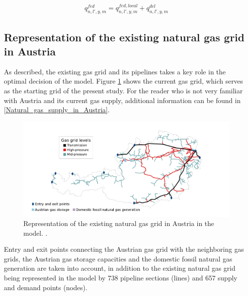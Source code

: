 \begin{align}\label{gas_balance_source}
	q^{fed}_{n,l',y,m} = q^{fed,local}_{n,l',y,m} + q^{del}_{n,l',y,m}
\end{align}

\subsection{Representation of the existing natural gas grid in Austria}\label{gas_grid_austria}
As described, the existing gas grid and its pipelines takes a key role in the optimal decision of the model. Figure \ref{method:existing_gas_grid} shows the current gas grid, which serves as the starting grid of the present study. For the reader who is not very familiar with Austria and its current gas supply, additional information can be found in \ref{Natural_gas_supply_in_Austria}. 

\begin{figure}[h]
	\centering
	\includegraphics[width=1\linewidth]{figures/method/existing_gas_grid/2023_existing_natural_gas_grid.pdf}
	\caption{Representation of the existing natural gas grid in Austria in the model.  \cite{econtrol_grid1,aggm_agid}.}
	\label{method:existing_gas_grid}
\end{figure}

Entry and exit points connecting the Austrian gas grid with the neighboring gas grids, the Austrian gas storage capacities and the domestic fossil natural gas generation are taken into account, in addition to the existing natural gas grid being represented in the model by 738 pipeline sections (lines) and 657 supply and demand points (nodes).\vspace{0.3cm}

